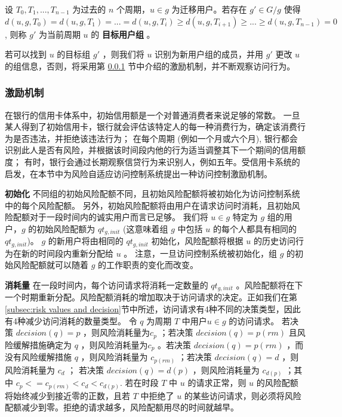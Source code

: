 \begin{definition}%
	\label{def:target group}
	设 $T_0,T_1,...,T_{n-1}$ 为过去的 $n$ 个周期，$u \in g$ 为迁移用户。若存在 $g' \in G/g$ 使得 $d(u,g,T_0) = d(u,g,T_1) = ... = d(u,g,T_i) \geq d(u,g,T_{i+1}) \geq ... \geq d(u,g,T_{n-1}) = 0$, 则称 $g'$ 为当前周期 $u$ 的 \textbf{目标用户组} 。 
\end{definition}

若可以找到 $u$ 的目标组 $g'$ ，则我们将 $u$ 识别为新用户组的成员，并用 $g'$ 更改 $u$ 的组信息，否则，将采用第 \ref{subsec:Incentive mechanism} 节中介绍的激励机制，并不断观察访问行为。

\subsubsection{激励机制}
\label{subsec:Incentive mechanism}

在银行的信用卡体系中，初始信用额是一个对普通消费者来说足够的常数。 一旦某人得到了初始信用卡，银行就会评估该特定人的每一种消费行为，确定该消费行为是否违法，并拒绝该违法行为； 在每个周期 (例如一个月或六个月), 银行都会识别此人是否有风险，并根据该时间段内他的行为适当调整其下一个期间的信用额度； 有时，银行会通过长期观察信贷行为来识别人，例如五年。受信用卡系统的启发，在本节中为风险自适应访问控制系统提出一种访问控制激励机制。

\textbf{初始化} 不同组的初始风险配额不同，且初始风险配额将被初始化为访问控制系统中的每个风险配额。 另外，初始风险配额将由用户在请求访问时消耗，且初始风险配额对于一段时间内的诚实用户而言已足够。 我们将 $u \in g$ 特定为 $g$ 组的用户，$g$ 的初始风险配额为 $qt_{g,init}$ (这意味着组 $g$ 中包括 $u$ 的每个人都具有相同的 $qt_{g,init}$)。 $g$ 的新用户将由相同的 $qt_{g,init}$ 初始化，风险配额将根据 $u$ 的历史访问行为在新的时间段内重新分配给 $u$ 。 注意，一旦访问控制系统被初始化，组 $g$ 的初始风险配额就可以随着 $g$ 的工作职责的变化而改变。

\textbf{消耗量} 在一段时间内，每个访问请求将消耗一定数量的 $qt_{g,init}$ 。风险配额将在下一个时期重新分配。风险配额消耗的增加取决于访问请求的决定。正如我们在第 \ref{subsec:risk values and decision}节中所述，访问请求有4种不同的决策类型，因此有4种减少访问消耗的数量类型。 令 $q$ 为周期 $T$ 中用户$u \in g$ 的访问请求。 若决策 $decision(q)=p$ ，则风险消耗量为$c_p$ ；若决策 $decision(q)=p(rm)$ 且风险缓解措施确定为 $q$ ，则风险消耗量为$c_p$ 。若决策 $decision(q)=p(rm)$ ，而没有风险缓解措施 $q$ ，则风险消耗量为 $c_{p(rm)}$ ；若决策 $decision(q)=d$ ，则风险消耗量为 $c_d$ ； 若决策 $decision(q)=d(p)$ ，则风险消耗量为 $c_{d(p)}$ ；其中 $c_p <= c_{p(rm)} < c_d < c_{d(p)}$. 若在时段 $T$ 中 $u$ 的请求正常，则 $u$ 的风险配额将始终减少到接近零的正数，且若 $T$ 中拒绝了 $u$ 的某些访问请求，则必须将风险配额减少到零。拒绝的请求越多，风险配额用尽的时间就越早。

